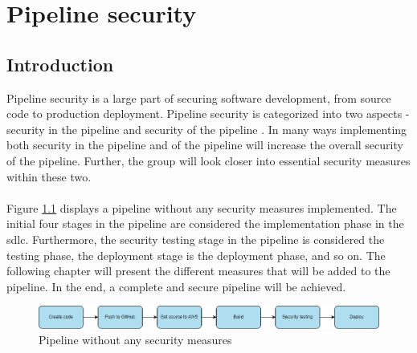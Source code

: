 \chapter{Pipeline security}
\label{Pipeline security}
\section{Introduction}
Pipeline security is a large part of securing software development, from source code to production deployment. Pipeline security is categorized into two aspects - security in the pipeline and security of the pipeline \cite{inofpipeline}. In many ways implementing both security in the pipeline and of the pipeline will increase the overall security of the pipeline. Further, the group will look closer into essential security measures within these two. 
\\~\\
Figure \ref{fig: Pipeline without any security measures} displays a \gls{pipeline} without any security measures implemented. The initial four stages in the pipeline are considered the implementation phase in the \acrshort{sdlc}. Furthermore, the security testing stage in the pipeline is considered the testing phase, the deployment stage is the deployment phase, and so on. The following chapter will present the different measures that will be added to the pipeline. In the end, a complete and secure pipeline will be achieved.

\vspace{2mm}
\begin{figure}[H]
    \centering
    \includegraphics[width=0.8\columnwidth]{Images/SecurePipeline-Page-3.drawio.png}
    \caption{Pipeline without any security measures}
    \label{fig: Pipeline without any security measures}
\end{figure}





